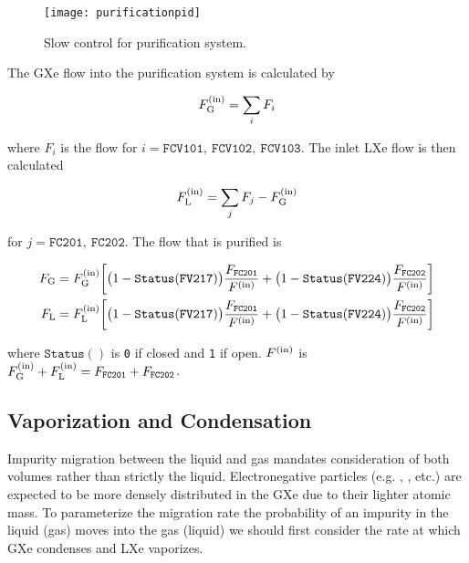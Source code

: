 \begin{figure}
\centering
\texttt{[image: purificationpid]}
\caption{Slow control for purification system.}
\label{fig:electron_lifetime_model_slow_control_pur}
\end{figure}

The GXe flow into the purification system is calculated by

\begin{equation}
F_{\mathrm{G}}^{(\mathrm{in})} = \sum_i F_i
\end{equation}

\noindent where $F_i$ is the flow for $i = \mathtt{FCV101,\ FCV102,\ FCV103}$.  The inlet LXe flow is then calculated

\begin{equation}
F_{\mathrm{L}}^{(\mathrm{in})} = \sum_j F_j - F_{\mathrm{G}}^{(\mathrm{in})}
\end{equation}

\noindent for $j = \mathtt{FC201,\ FC202}$.  The flow that is purified is

\begin{subequations}
\begin{align}
F_{\mathrm{G}} &= F_{\mathrm{G}}^{(\mathrm{in})} \bigg[ \big(1 - \mathtt{Status(FV217)}\big) \frac{F_{\mathtt{FC201}}}{F^{(\mathrm{in})}} +
\big(1 - \mathtt{Status(FV224)}\big) \frac{F_{\mathtt{FC202}}}{F^{(\mathrm{in})}} \bigg]
\\
F_{\mathrm{L}} &= F_{\mathrm{L}}^{(\mathrm{in})} \bigg[ \big(1 - \mathtt{Status(FV217)}\big) \frac{F_{\mathtt{FC201}}}{F^{(\mathrm{in})}} +
\big(1 - \mathtt{Status(FV224)}\big) \frac{F_{\mathtt{FC202}}}{F^{(\mathrm{in})}} \bigg]
\end{align}
\end{subequations}

\noindent where $\mathtt{Status()}$ is \texttt{0} if closed and \texttt{1} if open.  $F^{(\mathrm{in})}$ is
$F_{\mathrm{G}}^{(\mathrm{in})} + F_{\mathrm{L}}^{(\mathrm{in})} = F_{\mathtt{FC201}} + F_{\mathtt{FC202}}$.



\subsection{Vaporization and Condensation}
\label{subsec:electron_lifetime_model_vap_and_cond}
Impurity migration between the liquid and gas mandates consideration of both volumes rather than strictly the liquid.  Electronegative
particles (e.g. , , etc.) are expected to be more densely distributed in the GXe due to their lighter atomic mass.  To
parameterize the migration rate the probability of an impurity in the liquid (gas) moves into the gas (liquid) we should first
consider the rate at which GXe condenses and LXe vaporizes.

